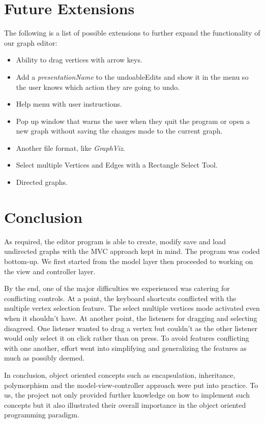 \documentclass[a4paper]{article}
\begin{document}
\section{Future Extensions}
\par The following is a list of possible extensions to further expand the functionality of our graph editor:
\begin{itemize}
    \item Ability to drag vertices with arrow keys.
    \item Add a \textit{presentationName} to the undoableEdits and show it in the menu so the user knows which action they are going to undo.
    \item Help menu with user instructions.
    \item Pop up window that warns the user when they quit the program or open a new graph without saving the changes made to the current graph.
    \item Another file format, like \textit{GraphViz}.
    \item Select multiple Vertices and Edges with a Rectangle Select Tool.
    \item Directed graphs.
\end{itemize}



\section{Conclusion}
\par As required, the editor program is able to create, modify save and load undirected graphs with the MVC approach kept in mind. The program was coded bottom-up. We first started from the model layer then proceeded to working on the view and controller layer. 
\par By the end, one of the major difficulties we experienced was catering for conflicting controls. At a point, the keyboard shortcuts conflicted with the multiple vertex selection feature. The select multiple vertices mode activated even when it shouldn't have. At another point, the listeners for dragging and selecting disagreed. One listener wanted to drag a vertex but couldn't as the other listener would only select it on click rather than on press. To avoid features conflicting with one another, effort went into simplifying and generalizing the features as much as possibly deemed.
\par In conclusion, object oriented concepts such as encapsulation, inheritance, polymorphism and the model-view-controller approach were put into practice. To us, the project not only provided further knowledge on how to implement such concepts but it also illustrated their overall importance in the object oriented programming paradigm.
\end{document}
